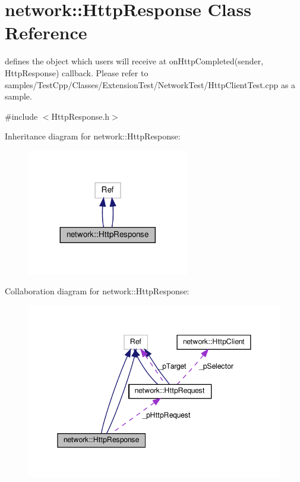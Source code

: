 \hypertarget{classnetwork_1_1HttpResponse}{}\section{network\+:\+:Http\+Response Class Reference}
\label{classnetwork_1_1HttpResponse}


defines the object which users will receive at on\+Http\+Completed(sender, Http\+Response) callback. Please refer to samples/\+Test\+Cpp/\+Classes/\+Extension\+Test/\+Network\+Test/\+Http\+Client\+Test.\+cpp as a sample.  




{\ttfamily \#include $<$Http\+Response.\+h$>$}



Inheritance diagram for network\+:\+:Http\+Response\+:
\nopagebreak
\begin{figure}[H]
\begin{center}
\leavevmode
\includegraphics[width=200pt]{classnetwork_1_1HttpResponse__inherit__graph}
\end{center}
\end{figure}


Collaboration diagram for network\+:\+:Http\+Response\+:
\nopagebreak
\begin{figure}[H]
\begin{center}
\leavevmode
\includegraphics[width=345pt]{classnetwork_1_1HttpResponse__coll__graph}
\end{center}
\end{figure}
